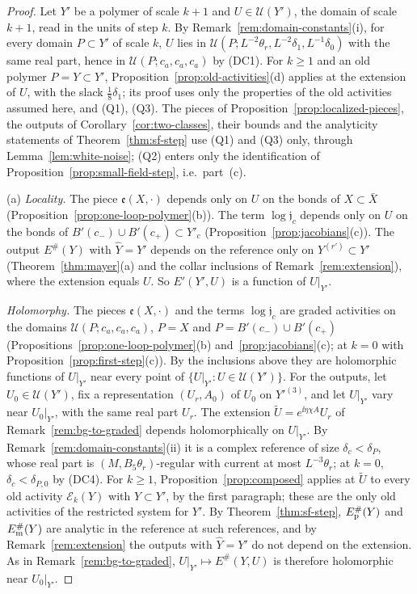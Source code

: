 \begin{proof}
Let $Y'$ be a polymer of scale $k+1$ and $U\in\mathcal U(Y')$, the domain of scale $k+1$, read in the units of step $k$. By Remark~\ref{rem:domain-constants}(i), for every domain $P\subset Y'$ of scale $k$, $U$ lies in $\mathcal U(P;L^{-2}\theta_r,L^{-2}\delta_1,L^{-1}\delta_0)$ with the same real part, hence in $\mathcal U(P;c_a,c_a,c_a)$ by (DC1). For $k\ge1$ and an old polymer $P=Y\subset Y'$, Proposition~\ref{prop:old-activities}(d) applies at the extension of $U$, with the slack $\frac18\delta_1$; its proof uses only the properties of the old activities assumed here, and (Q1), (Q3). The pieces of Proposition~\ref{prop:localized-pieces}, the outputs of Corollary~\ref{cor:two-classes}, their bounds and the analyticity statements of Theorem~\ref{thm:sf-step} use (Q1) and (Q3) only, through Lemma~\ref{lem:white-noise}; (Q2) enters only the identification of Proposition~\ref{prop:small-field-step}, i.e.\ part~(c).

(a) \emph{Locality.} The piece $\mathfrak e(X,\cdot)$ depends only on $U$ on the bonds of $X\subset\bar X$ (Proposition~\ref{prop:one-loop-polymer}(b)). The term $\log\mathfrak j_c$ depends only on $U$ on the bonds of $B'(c_-)\cup B'(c_+)\subset Y'_c$ (Proposition~\ref{prop:jacobians}(c)). The output $E^\#(Y)$ with $\hat Y=Y'$ depends on the reference only on $Y^{(r')}\subset Y'$ (Theorem~\ref{thm:mayer}(a) and the collar inclusions of Remark~\ref{rem:extension}), where the extension equals $U$. So $E'(Y',U)$ is a function of $U|_{Y'}$.

\emph{Holomorphy.} The pieces $\mathfrak e(X,\cdot)$ and the terms $\log\mathfrak j_c$ are graded activities on the domains $\mathcal U(P;c_a,c_a,c_a)$, $P=X$ and $P=B'(c_-)\cup B'(c_+)$ (Propositions~\ref{prop:one-loop-polymer}(b) and~\ref{prop:jacobians}(c); at $k=0$ with Proposition~\ref{prop:first-step}(c)). By the inclusions above they are holomorphic functions of $U|_{Y'}$ near every point of $\{U|_{Y'}:U\in\mathcal U(Y')\}$. For the outputs, let $U_0\in\mathcal U(Y')$, fix a representation $(U_r,A_0)$ of $U_0$ on $Y'^{(3)}$, and let $U|_{Y'}$ vary near $U_0|_{Y'}$, with the same real part $U_r$. The extension $\tilde U=e^{\ii\eta\chi A}U_r$ of Remark~\ref{rem:bg-to-graded} depends holomorphically on $U|_{Y'}$. By Remark~\ref{rem:domain-constants}(ii) it is a complex reference of size $\delta_c<\delta_P$, whose real part is $(M,B_5\theta_r)$-regular with current at most $L^{-3}\theta_r$; at $k=0$, $\delta_c<\delta_{P,0}$ by (DC4). For $k\ge1$, Proposition~\ref{prop:composed} applies at $\tilde U$ to every old activity $\mathcal E_k(Y)$ with $Y\subset Y'$, by the first paragraph; these are the only old activities of the restricted system for $Y'$. By Theorem~\ref{thm:sf-step}, $E^\#_{\rm p}(Y)$ and $E^\#_{\rm m}(Y)$ are analytic in the reference at such references, and by Remark~\ref{rem:extension} the outputs with $\hat Y=Y'$ do not depend on the extension. As in Remark~\ref{rem:bg-to-graded}, $U|_{Y'}\mapsto E^\#(Y,U)$ is therefore holomorphic near $U_0|_{Y'}$.


\end{proof}
